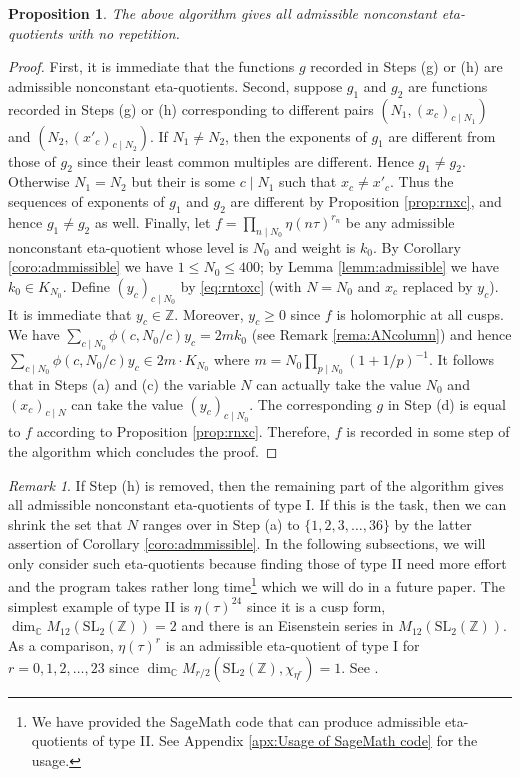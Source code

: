 \documentclass[12pt]{amsart}
\numberwithin{equation}{section}
\theoremstyle{plain}
\newtheorem{prop}[thm]{Proposition}
\theoremstyle{definition}
\theoremstyle{remark}
\newtheorem{rema}[thm]{Remark}
\newcommand\numZ{\mathbb{Z}}
\newcommand\numC{\mathbb{C}}
\newcommand\slZ{\mathrm{SL}_2(\mathbb{Z})}
\begin{document}
\begin{prop}
The above algorithm gives all admissible nonconstant eta-quotients with no repetition.
\end{prop}
\begin{proof}
First, it is immediate that the functions $g$ recorded in Steps (g) or (h) are admissible nonconstant eta-quotients. Second, suppose $g_1$ and $g_2$ are functions recorded in Steps (g) or (h) corresponding to different pairs $\left(N_1,(x_c)_{c\mid N_1}\right)$ and $\left(N_2,(x'_c)_{c\mid N_2}\right)$. If $N_1\neq N_2$, then the exponents of $g_1$ are different from those of $g_2$ since their least common multiples are different. Hence $g_1\neq g_2$. Otherwise $N_1=N_2$ but their is some $c\mid N_1$ such that $x_{c}\neq x'_{c}$. Thus the sequences of exponents of $g_1$ and $g_2$ are different by Proposition \ref{prop:rnxc}, and hence $g_1\neq g_2$ as well. Finally, let $f=\prod_{n\mid N_0}\eta(n\tau)^{r_n}$ be any admissible nonconstant eta-quotient whose level is $N_0$ and weight is $k_0$. By Corollary \ref{coro:admmissible} we have $1\leq N_0\leq 400$; by Lemma \ref{lemm:admissible} we have $k_0\in K_{N_0}$. Define $(y_c)_{c\mid N_0}$ by \eqref{eq:rntoxc} (with $N=N_0$ and $x_c$ replaced by $y_c$). It is immediate that $y_c\in\numZ$. Moreover, $y_c\geq0$ since $f$ is holomorphic at all cusps. We have $\sum_{c\mid N_0}\phi(c,N_0/c)y_c=2mk_0$ (see Remark \ref{rema:ANcolumn}) and hence $\sum_{c\mid N_0}\phi(c,N_0/c)y_c\in2m\cdot K_{N_0}$ where $m=N_0\prod_{p\mid N_0}(1+1/p)^{-1}$. It follows that in Steps (a) and (c) the variable $N$ can actually take the value $N_0$ and $(x_c)_{c\mid N}$ can take the value $(y_c)_{c\mid N_0}$. The corresponding $g$ in Step (d) is equal to $f$ according to Proposition \ref{prop:rnxc}. Therefore, $f$ is recorded in some step of the algorithm which concludes the proof.
\end{proof}
\begin{rema}
If Step (h) is removed, then the remaining part of the algorithm gives all admissible nonconstant eta-quotients of type I. If this is the task, then we can shrink the set that $N$ ranges over in Step (a) to $\{1,2,3,\dots,36\}$ by the latter assertion of Corollary \ref{coro:admmissible}. In the following subsections, we will only consider such eta-quotients because finding those of type II need more effort and the program takes rather long time\footnote{We have provided the SageMath code that can produce admissible eta-quotients of type II. See Appendix \ref{apx:Usage of SageMath code} for the usage.} which we will do in a future paper. The simplest example of type II is $\eta(\tau)^{24}$ since it is a cusp form, $\dim_\numC M_{12}(\slZ)=2$ and there is an Eisenstein series in $M_{12}(\slZ)$. As a comparison, $\eta(\tau)^{r}$ is an admissible eta-quotient of type I for $r=0,1,2,\dots,23$ since $\dim_\numC M_{r/2}(\slZ,\chi_{\eta^r})=1$. See \cite[Section 5]{ZZ23}.
\end{rema}
\end{document}
